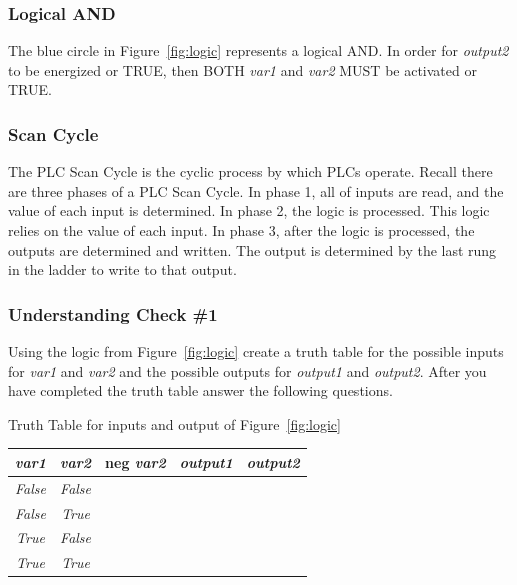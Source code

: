 \subsubsection*{Logical AND}
The blue circle in Figure~\ref{fig:logic} represents a logical AND. In order for \textit{output2} to be energized or TRUE, then BOTH \textit{var1} and \textit{var2} MUST be activated or TRUE.

\subsubsection*{Scan Cycle}
The PLC Scan Cycle is the cyclic process by which PLCs operate. Recall there are three phases of a PLC Scan Cycle. In phase 1, all of inputs are read, and the value of each input is determined. In phase 2, the logic is processed. This logic relies on the value of each input. In phase 3, after the logic is processed, the outputs are determined and written. The output is determined by the last rung in the ladder to write to that output. 

\subsubsection*{Understanding Check \#1}
Using the logic from Figure~\ref{fig:logic} create a truth table for the possible inputs for \textit{var1} and \textit{var2} and the possible outputs for \textit{output1} and \textit{output2}. After you have completed the truth table answer the following questions.

\begin{adjustwidth}{.5cm}{0cm}
Truth Table for inputs and output of Figure~\ref{fig:logic} \\
    \begin{tabular}{|c|c|c|c|c|} 
    
    \hline
    \textit{var1} & \textit{var2} & neg \textit{var2} & \textit{output1} & \textit{output2}\\
    \hline
    \textit{False} & \textit{False} & & & \\
    \hline 
    \textit{False} & \textit{True} & & & \\
    \hline 
    \textit{True} & \textit{False} & & & \\
    \hline 
    \textit{True} & \textit{True} & & & \\
    \hline 
    \end{tabular}
    \label{table:understanindCheck1}
\end{adjustwidth}

